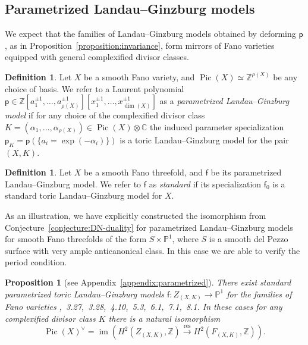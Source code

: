 \documentclass[10pt]{amsart}
\numberwithin{equation}{section}
\theoremstyle{plain}
\newtheorem{proposition}[theorem]{Proposition}
\theoremstyle{definition}
\newtheorem{definition}[theorem]{Definition}
\theoremstyle{remark}
\DeclareMathOperator{\im}{im}
\DeclareMathOperator{\Pic}{Pic}
\DeclareMathOperator{\res}{res}
\begin{document}
\subsection{Parametrized Landau--Ginzburg models}

We expect that the families of Landau--Ginzburg models obtained by deforming \(\mathsf{p}\), as in Proposition~\ref{proposition:invariance}, form mirrors of Fano varieties equipped with general complexified divisor classes.

\begin{definition}
  Let \(X\) be a smooth Fano variety, and \(\Pic(X) \simeq \mathbb{Z}^{\rho(X)}\) be any choice of basis. We refer to a Laurent polynomial \(\mathsf{p} \in \mathbb{Z}[a_1^{\pm 1}, \ldots, a_{\rho(X)}^{\pm 1}][x_1^{\pm 1}, \ldots, x_{\dim(X)}^{\pm 1}]\) as a \emph{parametrized Landau--Ginzburg model} if for any choice of the complexified divisor class \(K = (\alpha_1, \ldots, \alpha_{\rho(X)}) \in \Pic(X) \otimes \mathbb{C} \) the induced parameter specialization \(\mathsf{p}_K = \mathsf{p}(\{a_i = \exp(-\alpha_i)\})\) is a toric Landau--Ginzburg model for the pair \((X, K)\).
\end{definition}

\begin{definition}
  Let \(X\) be a smooth Fano threefold, and \(\mathsf{f}\) be its parametrized Landau--Ginzburg model. We refer to \(\mathsf{f}\) as \emph{standard} if its specialization \(\mathsf{f}_0\) is a standard toric Landau--Ginzburg model for \(X\).
\end{definition}

As an illustration, we have explicitly constructed the isomorphism from Conjecture~\ref{conjecture:DN-duality} for parametrized Landau--Ginzburg models for smooth Fano threefolds of the form \(S \times \mathbb{P}^1\), where \(S\) is a smooth del Pezzo surface with very ample anticanonical class. In this case we are able to verify the period condition.

\begin{proposition}[see Appendix~\ref{appendix:parametrized}]\label{proposition:parametrized}
  There exist standard parametrized toric Landau--Ginzburg models \(\mathsf{f} \colon Z_{(X, K)} \rightarrow \mathbb{P}^1\) for the families of Fano varieties ,~3.27,~3.28,~4.10,~5.3,~6.1,~7.1,~8.1. In these cases for any complexified divisor class \(K\) there is a natural isomorphism
  \[
    \Pic(X)^{\vee} = \im \left ( H^2(Z_{(X, K)}, \mathbb{Z}) \xrightarrow{\res} H^2(F_{(X, K)}, \mathbb{Z}) \right ).
  \]
\end{proposition}
\end{document}
